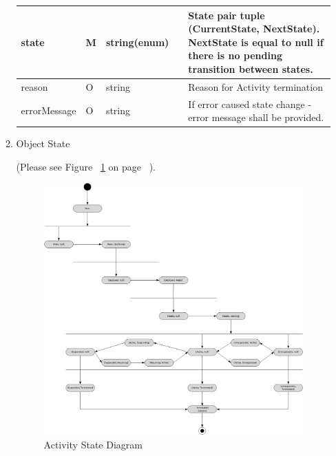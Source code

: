 \begin{enumerate}
\begin{enumerate}
\begin{table}[H]
\begin{center}
\begin{tabular}{|p{3cm}|l|p{3cm}|p{3cm}|p{4cm}|}
state				& M	&	string(enum)	& 	&	State pair tuple (CurrentState, NextState). 
													NextState is equal to null if there is no pending transition between states.\\
\hline  

reason 				& O	&	string			&	& 	Reason for Activity termination \\
\hline

errorMessage		& O	&	string			&	& 	If error caused state change - error message shall be provided. \\
\hline
 
\end{tabular}
\end{center}
\end{table}

\item Object State

(Please see Figure ~\ref{fig:AASD} on page ~\pageref{fig:AASD}).

\begin{figure}[H]
    \centering
    \includegraphics[width=14cm,angle=0]{./diag/Reference/ActivityState-Reference.png}
	\caption{Activity State Diagram}
    \label{fig:AASD}
\end{figure}

\begin{table}[H]
\footnotesize


\end{table}
\end{enumerate}
\end{enumerate}
